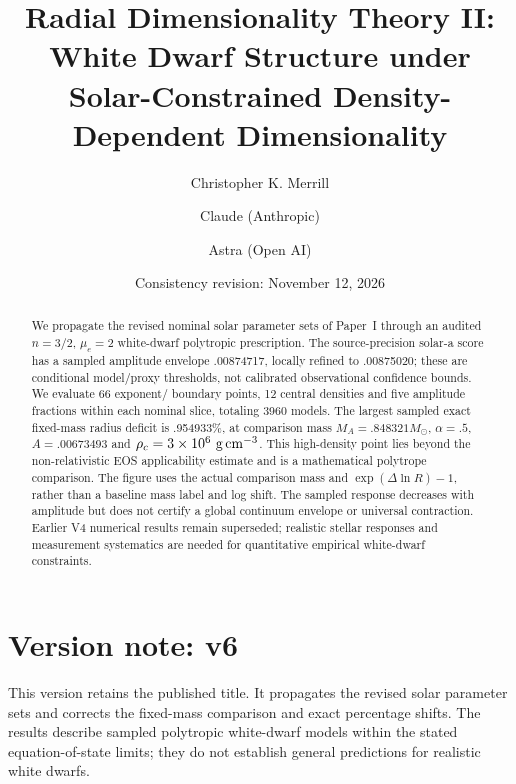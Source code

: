 \documentclass[twocolumn,prd,superscriptaddress,nofootinbib]{revtex4-2}
\begin{document}
\title{Radial Dimensionality Theory II: White Dwarf Structure under Solar-Constrained Density-Dependent Dimensionality}
\author{Christopher K. Merrill}

\author{Claude (Anthropic)}

\author{Astra (Open AI)}

\date{Consistency revision: November 12, 2026}

\begin{abstract}
We propagate the revised nominal solar parameter sets of Paper~I through
an audited $n=3/2$, $\mu_e=2$ white-dwarf polytropic prescription. The
source-precision solar-a score has a sampled amplitude envelope .00874717,
locally refined to .00875020; these are conditional model/proxy thresholds,
not calibrated observational confidence bounds. We evaluate 66 exponent/
boundary points, 12 central densities and five amplitude fractions within
each nominal slice, totaling 3960 models. The largest sampled exact
fixed-mass radius deficit is .954933\%, at comparison mass
$M_A=.848321M_\odot$, $\alpha=.5$, $A=.00673493$ and
$\rho_c=3\times10^6~{\rm g\,cm^{-3}}$. This high-density point lies beyond
the non-relativistic EOS applicability estimate and is a mathematical
polytrope comparison. The figure uses the actual comparison mass and
$\exp(\Delta\ln R)-1$, rather than a baseline mass label and log shift.
The sampled response decreases with amplitude but does not certify a
global continuum envelope or universal contraction. Earlier V4 numerical
results remain superseded; realistic stellar responses and measurement
systematics are needed for quantitative empirical white-dwarf constraints.

\end{abstract}

\maketitle

\section*{Version note: v6}
This version retains the published title. It propagates the revised solar parameter sets and corrects the fixed-mass comparison and exact percentage shifts. The results describe sampled polytropic white-dwarf models within the stated equation-of-state limits; they do not establish general predictions for realistic white dwarfs.
\end{document}
